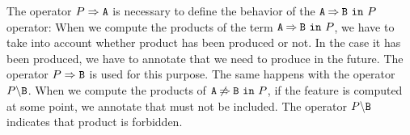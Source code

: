 The operator $\mandatory{A}{P}$ is necessary to define the behavior
of the $\require{A}{B}{P}$ operator:
When we compute the products of the term $\require{A}{B}{P}$, we have 
to take into account whether  product   has been produced or not.
In the case it has been produced, we have to annotate 
that we need to produce  in the future.
The operator $\mandatory{B}{P}$  is used for this purpose.
The same happens with  the operator $\forbid{B}{P}$.
When we  compute the products of $\exclude{A}{B}{P}$,   
if the feature  is computed
at some point, we  annotate
that  must not be included. The operator $\forbid{B}{P}$ indicates
that product  is forbidden.































